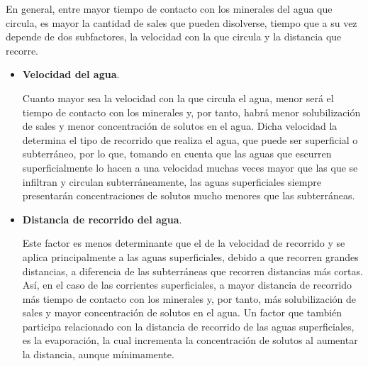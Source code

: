 En general, entre mayor tiempo de contacto con los minerales del agua que circula, es mayor la cantidad de sales que pueden disolverse, tiempo que a su vez depende de dos subfactores, la velocidad con la que circula y la distancia que recorre.
\begin{itemize}
  \item \textbf{Velocidad del agua}. 
  
  Cuanto mayor sea la velocidad con la que circula el agua, menor será el tiempo de contacto con los minerales y, por tanto, habrá menor solubilización de sales y menor concentración de solutos en el agua. Dicha velocidad la determina el tipo de recorrido que realiza el agua, que puede ser superficial o subterráneo, por lo que, tomando en cuenta que las aguas que escurren superficialmente lo hacen a una velocidad muchas veces mayor que las que se infiltran y circulan subterráneamente, las aguas superficiales siempre presentarán concentraciones de solutos mucho menores que las subterráneas.
  \item \textbf{Distancia de recorrido del agua}. 
  
  Este factor es menos determinante que el de la velocidad de recorrido y se aplica principalmente a las aguas superficiales, debido a que recorren grandes distancias, a diferencia de las subterráneas que recorren distancias más cortas. Así, en el caso de las corrientes superficiales, a mayor distancia de recorrido más tiempo de contacto con los minerales y, por tanto, más solubilización de sales y mayor concentración de solutos en el agua. Un factor que también participa relacionado con la distancia de recorrido de las aguas superficiales, es la evaporación, la cual incrementa la concentración de solutos al aumentar la distancia, aunque mínimamente.
\end{itemize}
